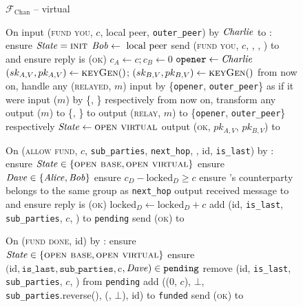 \begin{figure}[H]
  \begin{systembox}{$\mathcal{F}_{\mathrm{Chan}}$ -- virtual}
    \begin{algorithmic}[1]
      \State On input (\textsc{fund you}, $c$, local peer, \texttt{outer\_peer})
      by $\mathit{Charlie}$ to \alice: 
      \label{code:functionality:chan:skeleton:virtual:fund-you}
      \Indent
        \State ensure $\mathit{State} = \textsc{init}$
        \State $\mathit{Bob} \gets \text{ local peer}$
        \State send (\textsc{fund you}, $c$, \bob, \charlie, \alice) to
        \adversary and ensure reply is \textsc{(ok)}
        \label{code:functionality:chan:skeleton:virtual:inform}
        \State $c_A \gets c; c_B \gets 0$
        \State $\mathtt{opener} \gets \mathit{Charlie}$
        \State $(sk_{A, V}, pk_{A, V}) \gets \textsc{keyGen}()$; $(sk_{B, V},
        pk_{B, V}) \gets \textsc{keyGen}()$
        \State from now on, handle any (\textsc{relayed}, $m$) input by
        \{\texttt{opener}, \texttt{outer\_peer}\} as if it were input ($m$) by
        \{\alice, \bob\} respectively
        \State from now on, transform any output ($m$) to \{\alice, \bob\} to
        output (\textsc{relay}, $m$) to \{\texttt{opener},
        \texttt{outer\_peer}\} respectively
        \State $\mathit{State} \gets \textsc{open virtual}$
        \State output (\textsc{ok}, $pk_{A, V}$, $pk_{B, V}$) to \charlie
      \EndIndent
      \Statex

      \State On (\textsc{allow fund}, $c$, \texttt{sub\_parties},
      \texttt{next\_hop}, \dave, id, \texttt{is\_last}) by \charlie:
      \label{code:functionality:chan:skeleton:virtual:allow-fund}
      \Indent
        \State ensure $\mathit{State} \in \{\textsc{open base}, \textsc{open
        virtual}\}$
        \State ensure $\mathit{Dave} \in \{\mathit{Alice}, \mathit{Bob}\}$
        \State ensure $c_D - \mathrm{locked}_D \geq c$
        \State ensure \dave's counterparty belongs to the same group as
        \texttt{next\_hop}
        \State output received message to \dave and ensure reply is
        \textsc{(ok)}
        \State $\mathrm{locked}_D \gets \mathrm{locked}_D + c$
        \State add (id, \texttt{is\_last}, \texttt{sub\_parties}, $c$, \dave) to
        \texttt{pending}
        \State send (\textsc{ok}) to \charlie
      \EndIndent
      \Statex

      \State On (\textsc{fund done}, id) by \charlie:
      \Indent
        \State ensure $\mathit{State} \in \{\textsc{open base}, \textsc{open
        virtual}\}$
        \State ensure $(\mathrm{id}, \mathtt{is\_last}, \mathtt{sub\_parties},
        $c$, \mathit{Dave}) \in \mathtt{pending}$
        \State remove (id, \texttt{is\_last}, \texttt{sub\_parties}, $c$, \dave)
        from \texttt{pending}
          \State add ((0, $c$), $\bot$, \texttt{sub\_parties}.reverse(),
          (\dave, $\bot$), id) to \texttt{funded}
        \EndIf
        \State send (\textsc{ok}) to \charlie
      \EndIndent
      \Statex


\end{algorithmic}
\end{systembox}
\end{figure}

